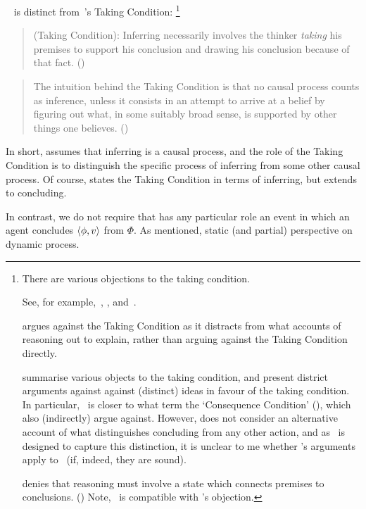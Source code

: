 \begin{note}
 ~\supportI{} is distinct from~\citeauthor{Boghossian:2014aa}'s Taking Condition:%
  \footnote{
    There are various objections to the taking condition.

    See, for example,~\textcite{Hlobil:2014tq}, \textcite{McHugh:2016vp}, and~\textcite{Wright:2014tt}.

    \citeauthor{Hlobil:2014tq} argues against the Taking Condition as it distracts from what accounts of reasoning out to explain, rather than arguing against the Taking Condition directly.

    \citeauthor{McHugh:2016vp} summarise various objects to the taking condition, and present district arguments against against (distinct) ideas in favour of the taking condition.
    In particular,~\supportI{} is closer to what \citeauthor{McHugh:2016vp} term the `Consequence Condition' (\citeyear[cf.][316]{McHugh:2016vp}), which \citeauthor{McHugh:2016vp} also (indirectly) argue against.
    However, \citeauthor{McHugh:2016vp} does not consider an alternative account of what distinguishes concluding from any other action, and as~\supportI{} is designed to capture this distinction, it is unclear to me whether \citeauthor{McHugh:2016vp}'s arguments apply to~\supportI{} (if, indeed, they are sound).

    \citeauthor{Wright:2014tt} denies that reasoning must involve a state which connects premises to conclusions. (\citeyear[Cf.][33-34]{Wright:2014tt})
    Note,~\supportI{} is compatible with \citeauthor{Wright:2014tt}'s objection.
  }

  \begin{quote}
    (Taking Condition):
    Inferring necessarily involves the thinker \emph{taking} his premises to support his conclusion and drawing his conclusion because of that fact.%
    \mbox{}\hfill\mbox{(\citeyear[5]{Boghossian:2014aa})}
  \end{quote}

  \begin{quote}
    The intuition behind the Taking Condition is that no causal process counts as inference, unless it consists in an attempt to arrive at a belief by figuring out what, in some suitably broad sense, is supported by other things one believes.%
    \mbox{}\hfill\mbox{(\citeyear[5]{Boghossian:2014aa})}
  \end{quote}

  In short, \citeauthor{Boghossian:2014aa} assumes that inferring is a causal process, and the role of the Taking Condition is to distinguish the specific process of inferring from some other causal process.
  Of course, \citeauthor{Boghossian:2014aa} states the Taking Condition in terms of inferring, but extends to concluding.

  In contrast, we do not require that \support{} has any particular role an event in which an agent concludes \(\langle \phi, v \rangle\) from \(\Phi\).
  As mentioned, static (and partial) perspective on dynamic process.
\end{note}

